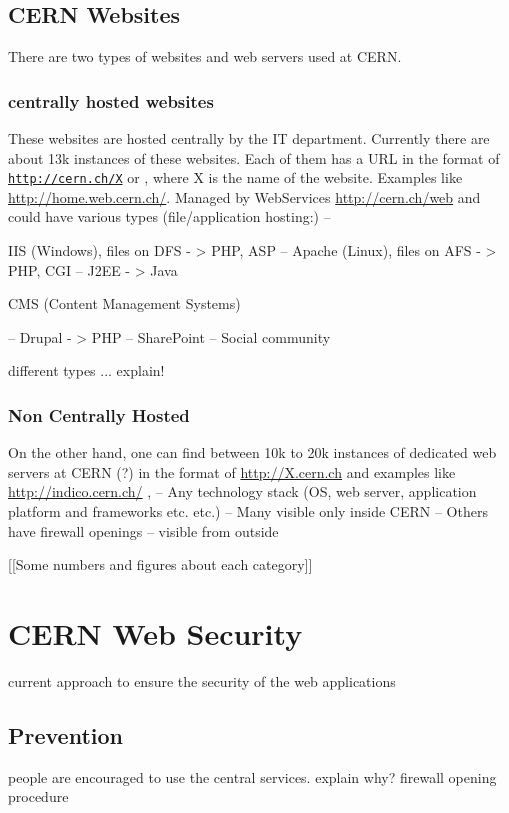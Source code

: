 \subsection{CERN Websites}
There are two types of websites and web servers used at CERN.
\subsubsection{centrally hosted websites}
These websites are hosted centrally by the IT department. Currently there are about 13k instances of these websites. Each of them has a URL in the format of \texttt{\url{http://cern.ch/X}} or \texttt{}, where X is the name of the website. Examples like \url{http://home.web.cern.ch/}. Managed by WebServices \url{http://cern.ch/web} and could have various types 
(file/application hosting:)
–

IIS (Windows), files on DFS
-
> PHP, ASP
–
Apache (Linux), files on AFS
-
> PHP, CGI
–
J2EE
-
>
Java 


CMS (Content Management Systems)

–
Drupal
-
> PHP
–
SharePoint
–
Social community











different types ... explain!
\subsubsection{Non Centrally Hosted}

On the other hand, one can find between 10k to 20k instances of dedicated web servers at CERN (?) in the format of \url{http://X.cern.ch} and examples like \url{http://indico.cern.ch/}
,
–
Any technology stack (OS, web server, application platform
and frameworks etc. etc.)
–
Many visible only inside CERN
–
Others have firewall openings
–
visible from outside

[[Some numbers and figures about each category]]


\section{CERN Web Security}
current approach to ensure the security of the web applications
\subsection{Prevention}
people are encouraged to use the central services. explain why?
firewall opening procedure

